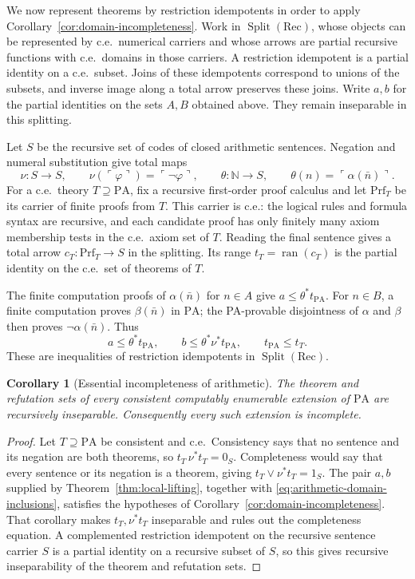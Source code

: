 \documentclass[11pt]{article}
\newtheorem{corollary}[theorem]{Corollary}
\newcommand{\N}{\mathbb N}
\newcommand{\PA}{\mathrm{PA}}
\newcommand{\ran}{\operatorname{ran}}
\begin{document}
We now represent theorems by restriction idempotents in order to apply
Corollary~\ref{cor:domain-incompleteness}. Work in
$\operatorname{Split}(\mathrm{Rec})$, whose objects can be represented
by c.e.\ numerical carriers and whose arrows are partial recursive
functions with c.e.\ domains in those carriers. A restriction idempotent
is a partial identity on a c.e.\ subset. Joins of these idempotents
correspond to unions of the subsets, and inverse image along a total
arrow preserves these joins. Write $a,b$ for the partial
identities on the sets $A,B$ obtained above. They remain inseparable
in this splitting.

Let $S$ be the recursive set of codes of closed arithmetic sentences.
Negation and numeral substitution give total maps
\[
 \nu:S\to S,\qquad \nu(\ulcorner\varphi\urcorner)
     =\ulcorner\neg\varphi\urcorner,
 \qquad
 \theta:\N\to S,\qquad \theta(n)=\ulcorner\alpha(\bar n)\urcorner.
\]
For a c.e.\ theory $T\supseteq\PA$, fix a recursive first-order proof
calculus and let $\mathrm{Prf}_T$ be its carrier of finite proofs from
$T$. This carrier is c.e.: the logical rules and formula syntax are
recursive, and each candidate proof has only finitely many axiom
membership tests in the c.e.\ axiom set of $T$. Reading the final
sentence gives a total arrow
$c_T:\mathrm{Prf}_T\to S$ in the splitting. Its range
$t_T=\ran(c_T)$ is the partial identity on the c.e.\ set of theorems
of $T$.

The finite computation proofs of $\alpha(\bar n)$ for $n\in A$ give
$a\le\theta^*t_{\PA}$. For $n\in B$, a finite computation proves
$\beta(\bar n)$ in $\PA$; the PA-provable disjointness of $\alpha$
and $\beta$ then proves $\neg\alpha(\bar n)$. Thus
\begin{equation}\label{eq:arithmetic-domain-inclusions}
 a\le\theta^*t_{\PA},\qquad
 b\le\theta^*\nu^*t_{\PA},\qquad
 t_{\PA}\le t_T.
\end{equation}
These are inequalities of restriction idempotents in $\operatorname{Split}(\mathrm{Rec})$.

\begin{corollary}[Essential incompleteness of arithmetic]\label{cor:arithmetic}
The theorem and refutation sets of every consistent computably
enumerable extension of $\PA$ are recursively inseparable.
Consequently every such extension is incomplete.
\end{corollary}
\begin{proof}
Let $T\supseteq\PA$ be consistent and c.e.\ Consistency says that
no sentence and its negation are both theorems, so
$t_T\,\nu^*t_T=0_S$. Completeness would say that every sentence or
its negation is a theorem, giving $t_T\vee\nu^*t_T=1_S$.
The pair $a,b$ supplied by Theorem~\ref{thm:local-lifting}, together
with \eqref{eq:arithmetic-domain-inclusions}, satisfies the hypotheses
of Corollary~\ref{cor:domain-incompleteness}. That corollary makes
$t_T,\nu^*t_T$ inseparable and rules out the completeness equation.
A complemented restriction idempotent on the recursive sentence carrier
$S$ is a partial identity on a recursive subset of $S$, so this gives
recursive inseparability of the theorem and refutation sets.
\end{proof}
\end{document}
